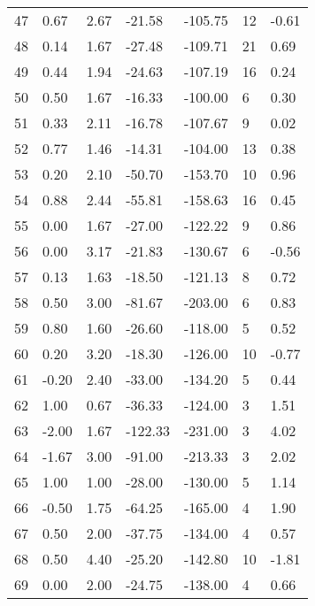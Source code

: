 \begin{appendices}
\begin{longtable}[c]{@{}lllllll@{}}
47 & 0.67 & 2.67 & -21.58 & -105.75 & 12 & -0.61 \\
\rowcolor[HTML]{FFCCC9}
48 & 0.14 & 1.67 & -27.48 & -109.71 & 21 & 0.69 \\
\rowcolor[HTML]{FFCCC9}
49 & 0.44 & 1.94 & -24.63 & -107.19 & 16 & 0.24 \\
\rowcolor[HTML]{FFCCC9}
50 & 0.50 & 1.67 & -16.33 & -100.00 & 6 & 0.30 \\
\rowcolor[HTML]{FFCCC9}
51 & 0.33 & 2.11 & -16.78 & -107.67 & 9 & 0.02 \\
\rowcolor[HTML]{FFCCC9}
52 & 0.77 & 1.46 & -14.31 & -104.00 & 13 & 0.38 \\
\rowcolor[HTML]{FFCCC9}
53 & 0.20 & 2.10 & -50.70 & -153.70 & 10 & 0.96 \\
\rowcolor[HTML]{FFCCC9}
54 & 0.88 & 2.44 & -55.81 & -158.63 & 16 & 0.45 \\
\rowcolor[HTML]{FFCCC9}
55 & 0.00 & 1.67 & -27.00 & -122.22 & 9 & 0.86 \\
\rowcolor[HTML]{FFCCC9}
56 & 0.00 & 3.17 & -21.83 & -130.67 & 6 & -0.56 \\
\rowcolor[HTML]{FFCCC9}
57 & 0.13 & 1.63 & -18.50 & -121.13 & 8 & 0.72 \\
\rowcolor[HTML]{FFCCC9}
58 & 0.50 & 3.00 & -81.67 & -203.00 & 6 & 0.83 \\
\rowcolor[HTML]{FFCCC9}
59 & 0.80 & 1.60 & -26.60 & -118.00 & 5 & 0.52 \\
\rowcolor[HTML]{FFCCC9}
60 & 0.20 & 3.20 & -18.30 & -126.00 & 10 & -0.77 \\
\rowcolor[HTML]{FFCCC9}
61 & -0.20 & 2.40 & -33.00 & -134.20 & 5 & 0.44 \\
\rowcolor[HTML]{FFCCC9}
62 & 1.00 & 0.67 & -36.33 & -124.00 & 3 & 1.51 \\
\rowcolor[HTML]{FFCCC9}
63 & -2.00 & 1.67 & -122.33 & -231.00 & 3 & 4.02 \\
\rowcolor[HTML]{FFCCC9}
64 & -1.67 & 3.00 & -91.00 & -213.33 & 3 & 2.02 \\
\rowcolor[HTML]{FFCCC9}
65 & 1.00 & 1.00 & -28.00 & -130.00 & 5 & 1.14 \\
\rowcolor[HTML]{FFCCC9}
66 & -0.50 & 1.75 & -64.25 & -165.00 & 4 & 1.90 \\
\rowcolor[HTML]{FFCCC9}
67 & 0.50 & 2.00 & -37.75 & -134.00 & 4 & 0.57 \\
\rowcolor[HTML]{FFCCC9}
68 & 0.50 & 4.40 & -25.20 & -142.80 & 10 & -1.81 \\
\rowcolor[HTML]{FFCCC9}
69 & 0.00 & 2.00 & -24.75 & -138.00 & 4 & 0.66 \\

\end{longtable}
\end{appendices}
